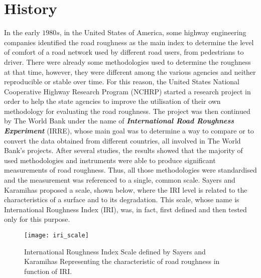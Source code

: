 \documentclass[tesi]{subfiles}
\begin{document}
\section{History}\label{sc:IRI_History}
In the early $1980s$, in the United States of America, some highway engineering companies identified the road roughness as the main index to determine the level of comfort of a road network used by different road users, from pedestrians to driver. 
There were already some methodologies used to determine the roughness at that time, however, they were different among the various agencies and neither reproducible or stable over time. 
For this reason, the United States National Cooperative Highway Research Program (NCHRP) started a research project in order to help the state agencies to improve the utilisation of their own methodology for evaluating the road roughness\cite{gillespie1980calibration}. The project was then continued by The World Bank\cite{sayers1986guidelines} under the name of \textbf{\textit{International Road Roughness Experiment}} (IRRE)\cite{sayers1986internationalscale}, whose main goal was to determine a way to compare or to convert the data obtained from different countries, all involved in The World Bank's projects.
After several studies, the results showed that the majority of used methodologies and instruments were able to produce significant measurements\cite{sayers1986international} of road roughness. Thus, all those methodologies were standardised and the measurement was referenced to a single, common scale.
Sayers and Karamihas\cite{little_book} proposed a scale, shown below, where the IRI level is related to the characteristics of a surface and to its degradation. This scale, whose name is International Roughness Index (IRI), was, in fact, first defined and then tested only for this purpose.
\vspace{0.2cm}
\begin{figure}[H]
\centering
\texttt{[image: iri\_scale]}
\caption{International Roughness Index Scale defined by Sayers and Karamihas \cite{little_book}
Representing the characteristic of road roughness in function of IRI.}
\label{fig:International Roughness Index Scale}
\end{figure}
\clearpage
\end{document}
